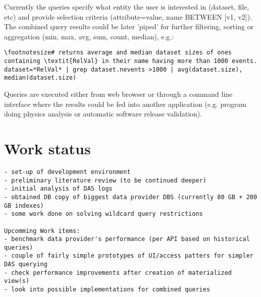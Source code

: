 \documentclass[a4paper,11pt]{article}
\begin{document}
Currently the queries specify what entity the user is interested in (dataset, file, etc) and provide selection criteria (attribute=value, name BETWEEN [v1, v2]). The combined query results could be later 'piped' for further filtering, sorting or aggregation (min, max, avg, sum, count, median), e.g.:

{\small 
\begin{Verbatim}[commandchars=\\\{\}]
\footnotesize# returns average and median dataset sizes of ones containing \textit{RelVal} in their name having more than 1000 events.
dataset=*RelVal* | grep dataset.nevents >1000 | avg(dataset.size), median(dataset.size)
\end{Verbatim}
}

Queries are executed either from web browser or through a command line interface where the results could be fed into another application (e.g. program doing physics analysis or automatic software release validation).








\newpage
\section{Work status}
{\begin{footnotesize}
\begin{verbatim}
- set-up of development environment
- preliminary literature review (to be continued deeper)
- initial analysis of DAS logs
- obtained DB copy of biggest data provider DBS (currently 80 GB + 200 GB indexes)
- some work done on solving wildcard query restrictions

Upcomming Work items:
- benchmark data provider's performance (per API based on historical queries)
- couple of fairly simple prototypes of UI/access patters for simpler DAS querying
- check performance improvements after creation of materialized view(s)
- look into possible implementations for combined queries

\end{verbatim}
\end{footnotesize}
}


\thispagestyle{empty}
\begin{small}

\end{small}
\end{document}
